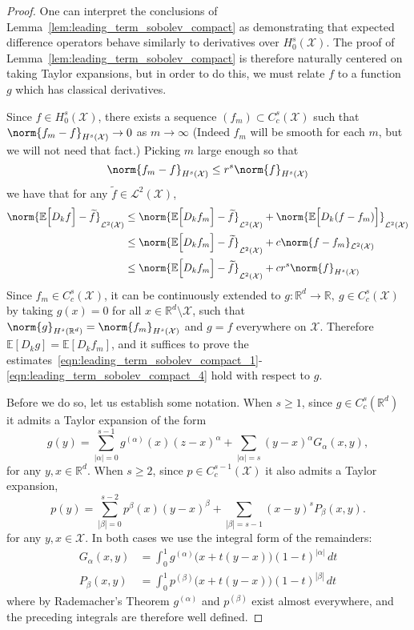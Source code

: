 \documentclass{article}
\newcommand{\Reals}{\mathbb{R}}
\newcommand{\abs}[1]{\left \lvert #1 \right \rvert}
\newcommand{\1}{\mathbf{1}}
\newcommand{\Rd}{\Reals^d}
\newcommand{\Xset}{\mathcal{X}}
\newcommand{\Leb}{\mathcal{L}}
\newcommand{\Ebb}{\mathbb{E}}
\newcommand{\wt}[1]{\widetilde{#1}}
\theoremstyle{alden}
\theoremstyle{aldenthm}
\theoremstyle{definition}
\theoremstyle{remark}
\begin{document}
\begin{proof}
	One can interpret the conclusions of Lemma~\ref{lem:leading_term_sobolev_compact} as demonstrating that expected difference operators behave similarly to derivatives over $H_0^{s}(\Xset)$. The proof of Lemma~\ref{lem:leading_term_sobolev_compact} is therefore naturally centered on taking Taylor expansions, but in order to do this, we must relate $f$ to a function $g$ which has classical derivatives. 
	
	Since $f \in H_0^s(\Xset)$, there exists a sequence $(f_m) \subset C_c^s(\Xset)$ such that $\norm{f_m - f}_{H^s(\Xset)} \to 0$ as $m \to \infty$ (Indeed $f_m$ will be smooth for each $m$, but we will not need that fact.) Picking $m$ large enough so that
	\begin{equation*}
	\norm{f_m - f}_{H^s(\Xset)} \leq r^s \norm{f}_{H^s(\Xset)}
	\end{equation*}
	we have that for any $\wt{f} \in \Leb^2(\Xset)$,
	\begin{align*}
	\norm{\Ebb\Bigl[D_kf\Bigr] - \wt{f}}_{\Leb^2(\Xset)} & \leq \norm{\Ebb\Bigl[D_kf_m\Bigr] - \wt{f}}_{\Leb^2(\Xset)} + \norm{\Ebb\Bigl[D_k(f - f_m)\Bigr]}_{\Leb^2(\Xset)} \\
	& \leq \norm{\Ebb\Bigl[D_kf_m\Bigr] - \wt{f}}_{\Leb^2(\Xset)} + c \norm{f - f_m}_{\Leb^2(\Xset)} \\
	& \leq \norm{\Ebb\Bigl[D_kf_m\Bigr] - \wt{f}}_{\Leb^2(\Xset)} + c r^s \norm{f}_{H^s(\Xset)}
	\end{align*}
	Since $f_m \in C_c^s(\Xset)$, it can be continuously extended to $g: \Rd \to \Reals,~ g \in C_c^s(\Xset)$ by taking $g(x) = 0$ for all $x \in \Rd \setminus \Xset$, such that $\norm{g}_{H^s(\Rd)} = \norm{f_m}_{H^s(\Xset)}$ and $g = f$ everywhere on $\Xset$. Therefore $\Ebb[D_kg] =\Ebb[D_kf_m]$, and it suffices to prove the estimates~\eqref{eqn:leading_term_sobolev_compact_1}-\eqref{eqn:leading_term_sobolev_compact_4} hold with respect to $g$. 
	
	Before we do so, let us establish some notation. When $s \geq 1$, since $g \in C_c^s(\Rd)$ it admits a Taylor expansion of the form
	\begin{equation*}
	g(y) =  \sum_{\abs{\alpha} = 0}^{s - 1} g^{(\alpha)}(x) (z - x)^{\alpha} + \sum_{\abs{\alpha} = s} (y - x)^{\alpha} G_{\alpha}(x,y),
	\end{equation*}
	for any $y,x \in \Rd$. When $s \geq 2$, since $p \in C_c^{s - 1}(\Xset)$ it also admits a Taylor expansion,
	\begin{equation*}
	p(y) = \sum_{\abs{\beta} = 0}^{s - 2} p^{\beta}(x) (y - x)^{\beta} + \sum_{\abs{\beta} = s - 1} (x - y)^s P_{\beta}(x,y).
	\end{equation*}
	for any $y,x \in \Xset$.
	In both cases we use the integral form of the remainders:
	\begin{align*}
	G_{\alpha}(x,y) & = \int_{0}^{1} g^{(\alpha)}\bigl(x + t(y - x)\bigr)(1 - t)^{\abs{\alpha}} \,dt \\
	P_{\beta}(x,y) & = \int_{0}^{1} p^{(\beta)}\bigl(x + t(y - x)\big) (1 - t)^{\abs{\beta}}  \,dt 
	\end{align*}
	where by Rademacher's Theorem $g^{(\alpha)}$ and $p^{(\beta)}$ exist almost everywhere, and the preceding integrals are therefore well defined.
	

\end{proof}
\end{document}

